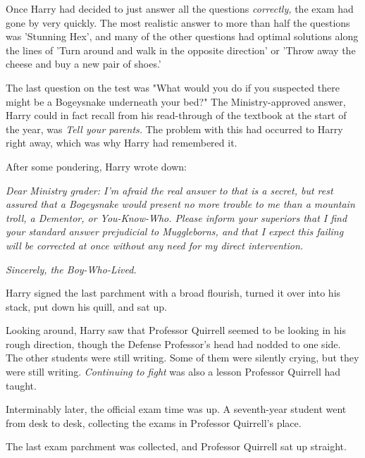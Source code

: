 Once Harry had decided to just answer all the questions \emph{correctly,} the exam had gone by very quickly. The most realistic answer to more than half the questions was 'Stunning Hex', and many of the other questions had optimal solutions along the lines of 'Turn around and walk in the opposite direction' or 'Throw away the cheese and buy a new pair of shoes.'

The last question on the test was "What would you do if you suspected there might be a Bogeysnake underneath your bed?" The Ministry-approved answer, Harry could in fact recall from his read-through of the textbook at the start of the year, was \emph{Tell your parents.} The problem with this had occurred to Harry right away, which was why Harry had remembered it.

After some pondering, Harry wrote down:

\emph{Dear Ministry grader: I'm afraid the real answer to that is a secret, but rest assured that a Bogeysnake would present no more trouble to me than a mountain troll, a Dementor, or You-Know-Who. Please inform your superiors that I find your standard answer prejudicial to Muggleborns, and that I expect this failing will be corrected at once without any need for my direct intervention.}

\emph{Sincerely, the Boy-Who-Lived.}

Harry signed the last parchment with a broad flourish, turned it over into his stack, put down his quill, and sat up.

Looking around, Harry saw that Professor Quirrell seemed to be looking in his rough direction, though the Defense Professor's head had nodded to one side. The other students were still writing. Some of them were silently crying, but they were still writing. \emph{Continuing to fight} was also a lesson Professor Quirrell had taught.

Interminably later, the official exam time was up. A seventh-year student went from desk to desk, collecting the exams in Professor Quirrell's place.

The last exam parchment was collected, and Professor Quirrell sat up straight.

